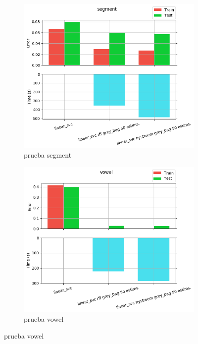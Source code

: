 \begin{figure}[ht]
  \centering
  \begin{subfigure}[b]{0.5\linewidth}
    \centering\captionsetup{width=.8\linewidth}\includegraphics[width=\imgscale\linewidth]{Figures/2_7/segment}
    \caption{prueba segment}
    \label{fig:2_7_segment}
  \end{subfigure}%
  \begin{subfigure}[b]{0.5\linewidth}
    \centering\captionsetup{width=.8\linewidth}\includegraphics[width=\imgscale\linewidth]{Figures/2_7/vowel}
    \caption{prueba vowel}
    \label{fig:2_7_vowel}
  \end{subfigure}
\end{figure}
